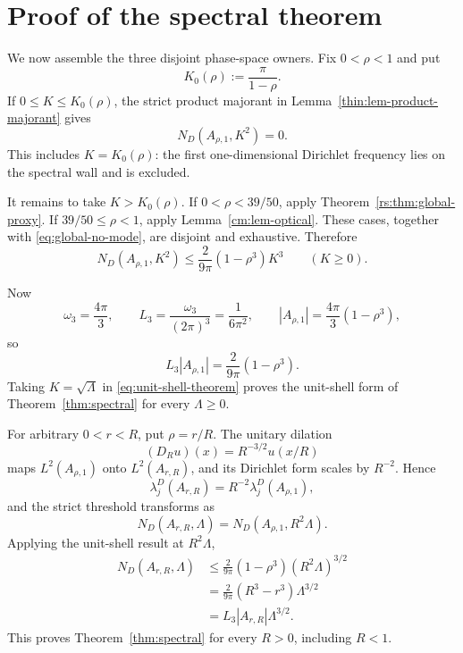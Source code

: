 \documentclass[11pt]{article}
\numberwithin{equation}{section}
\theoremstyle{definition}
\theoremstyle{remark}
\begin{document}
\section{Proof of the spectral theorem}

We now assemble the three disjoint phase-space owners.  Fix
\(0<\rho<1\) and put
\[
 K_0(\rho):=\frac{\pi}{1-\rho}.
\]
If \(0\leq K\leq K_0(\rho)\), the strict product majorant in
Lemma~\ref{thin:lem-product-majorant} gives
\begin{equation}
 N_D(A_{\rho,1},K^2)=0.
 \label{eq:global-no-mode}
\end{equation}
This includes \(K=K_0(\rho)\): the first one-dimensional Dirichlet
frequency lies on the spectral wall and is excluded.

It remains to take \(K>K_0(\rho)\).  If
\(0<\rho<39/50\), apply
Theorem~\ref{rs:thm:global-proxy}.  If
\(39/50\leq\rho<1\), apply Lemma~\ref{cm:lem-optical}.  These cases,
together with \eqref{eq:global-no-mode}, are disjoint and exhaustive.
Therefore
\begin{equation}
  N_D(A_{\rho,1},K^2)
  \le\frac{2}{9\pi}(1-\rho^3)K^3
  \qquad(K\ge0).
  \label{eq:unit-shell-theorem}
\end{equation}

Now
\[
  \omega_3=\frac{4\pi}{3},
  \qquad
  L_3=\frac{\omega_3}{(2\pi)^3}=\frac1{6\pi^2},
  \qquad
  |A_{\rho,1}|=\frac{4\pi}{3}(1-\rho^3),
\]
so
\begin{equation}
  L_3|A_{\rho,1}|=\frac{2}{9\pi}(1-\rho^3).
  \label{eq:weyl-normalization}
\end{equation}
Taking \(K=\sqrt\Lambda\) in \eqref{eq:unit-shell-theorem} proves the
unit-shell form of Theorem~\ref{thm:spectral} for every \(\Lambda\ge0\).

For arbitrary \(0<r<R\), put \(\rho=r/R\).  The unitary dilation
\[
  (D_Ru)(x)=R^{-3/2}u(x/R)
\]
maps \(L^2(A_{\rho,1})\) onto \(L^2(A_{r,R})\), and its Dirichlet form
scales by \(R^{-2}\).  Hence
\[
  \lambda_j^D(A_{r,R})=R^{-2}\lambda_j^D(A_{\rho,1}),
\]
and the strict threshold transforms as
\begin{equation}
  N_D(A_{r,R},\Lambda)
  =N_D(A_{\rho,1},R^2\Lambda).
  \label{eq:dilation-count}
\end{equation}
Applying the unit-shell result at \(R^2\Lambda\),
\[
\begin{aligned}
  N_D(A_{r,R},\Lambda)
  &\le\frac{2}{9\pi}(1-\rho^3)(R^2\Lambda)^{3/2}\\
  &=\frac{2}{9\pi}(R^3-r^3)\Lambda^{3/2}\\
  &=L_3|A_{r,R}|\Lambda^{3/2}.
\end{aligned}
\]
This proves Theorem~\ref{thm:spectral} for every \(R>0\), including
\(R<1\).
\end{document}
